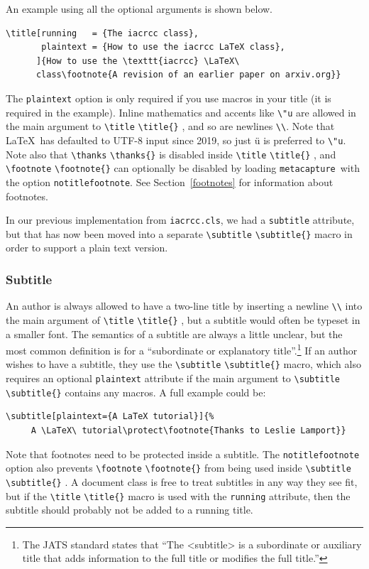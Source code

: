 \documentclass{article}
\newcommand{\pkgname}{\texttt{metacapture}}
\newcommand{\cmd}[2][]{%
  \def\FirstArg{#1}%
  \ifx\FirstArg\empty%
    \texttt{\textbackslash{}#2}%
  \else%
    \texttt{\textbackslash{}#2\{#1\}}%
  \fi
}
\begin{document}
\noindent An example using all the optional arguments is shown below.

\begin{Verbatim}[samepage=true]
\title[running   = {The iacrcc class},
       plaintext = {How to use the iacrcc LaTeX class},
      ]{How to use the \texttt{iacrcc} \LaTeX\
      class\footnote{A revision of an earlier paper on arxiv.org}}
\end{Verbatim}

The \verb+plaintext+ option is only required if you use macros in
your title (it is required in the example). Inline mathematics and
accents like \verb+\"u+ are allowed in the main argument to \cmd{title},
and so are newlines \texttt{\textbackslash\textbackslash}. Note
that \LaTeX\ has defaulted to UTF-8 input since 2019, so just ü is
preferred to \verb+\"u+. Note also that \cmd{thanks} is disabled
inside \cmd{title}, and \cmd{footnote} can optionally be disabled by loading
\pkgname\ with the option \texttt{notitlefootnote}. See
Section~\ref{footnotes} for information about footnotes.

In our previous implementation from \texttt{iacrcc.cls}, we had a
\texttt{subtitle} attribute, but that has now been moved into a separate
\cmd{subtitle} macro in order to support a plain text version.

\subsubsection{Subtitle}
An author is always allowed to have a two-line title by inserting a
newline \texttt{\textbackslash\textbackslash} into the main argument
of \cmd{title}, but a subtitle would often be typeset in a smaller
font.  The semantics of a subtitle are always a little unclear, but
the most common definition is for a ``subordinate or explanatory
title''.\footnote{The JATS standard states that ``The <subtitle> is a
subordinate or auxiliary title that adds information to the full title
or modifies the full title.''}  If an author wishes to have a
subtitle, they use the \cmd{subtitle} macro, which also requires an
optional \texttt{plaintext} attribute if the main argument
to \cmd{subtitle} contains any macros.  A full example could be:
\begin{Verbatim}[samepage=true]
\subtitle[plaintext={A LaTeX tutorial}]{%
     A \LaTeX\ tutorial\protect\footnote{Thanks to Leslie Lamport}}
\end{Verbatim}
Note that footnotes need to be protected inside a subtitle.
The \texttt{notitlefootnote} option also prevents
\cmd{footnote} from being used inside \cmd{subtitle}. A
document class is free to treat subtitles in any way they see fit, but
if the \cmd{title} macro is used with the \texttt{running} attribute,
then the subtitle should probably not be added to a running title.
\end{document}
